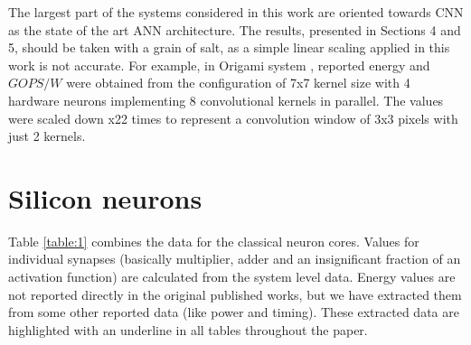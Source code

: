 \documentclass[conference, compsoc]{IEEEtran}
\begin{document}
The largest part of the systems considered in this work are oriented towards CNN as the state of the art ANN architecture. The results, presented in Sections 4 and 5, should be taken with a grain of salt, as a simple linear scaling applied in this work is not accurate. For example, in Origami system \cite{Origami}, reported energy and $ GOPS/W $ were obtained from the configuration of 7x7 kernel size with 4 hardware neurons implementing 8 convolutional kernels in parallel. The values were scaled down x22 times to represent a convolution window of 3x3 pixels with just 2 kernels.

\section{Silicon neurons}
Table \ref{table:1} combines the data for the classical neuron cores. Values for individual synapses (basically multiplier, adder and an insignificant fraction of an activation function) are calculated from the system level data. Energy values are not reported directly in the original published works, but we have extracted them from some other reported data (like power and timing). These extracted data are highlighted with an underline in all tables throughout the paper.
\end{document}
